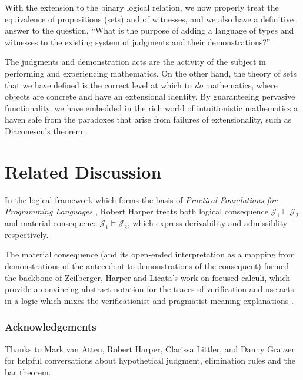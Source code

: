 \documentclass[11pt]{amsart}
\theoremstyle{definition}
\theoremstyle{remark}
\numberwithin{equation}{section}
\newcommand\JJ{\mathcal{J}}
\begin{document}
With the extension to the binary logical relation, we now properly treat the
equivalence of propositions (sets) and of witnesses, and we also have a
definitive answer to the question, ``What is the purpose of adding a language of
types and witnesses to the existing system of judgments and their
demonstrations?''

The judgments and demonstration acts are the activity of the subject in
performing and experiencing mathematics. On the other hand, the theory of sets
that we have defined is the correct level at which to \emph{do} mathematics,
where objects are concrete and have an extensional identity. By guaranteeing
pervasive functionality, we have embedded in the rich world of intuitionistic
mathematics a haven safe from the paradoxes that arise from failures of
extensionality, such as Diaconescu's theorem \cite{sterling:diaconescu}.

\section{Related Discussion}

In the logical framework which forms the basis of \emph{Practical Foundations
for Programming Languages} \cite{PFPL}, Robert Harper treats both logical
consequence $\JJ_1\vdash\JJ_2$ and material consequence $\JJ_1\vDash\JJ_2$,
which express derivability and admissiblity respectively.

The material consequence (and its open-ended interpretation as a mapping from
demonstrations of the antecedent to demonstrations of the consequent) formed the
backbone of Zeilberger, Harper and Licata's work on focused calculi, which
provide a convincing abstract notation for the traces of verification and use
acts in a logic which mixes the verificationist and pragmatist meaning
explanations \cite{zeilberger:thesis, licata-zeilberger-harper:focusing,
zeilberger:2008}.


\subsubsection*{Acknowledgements}

Thanks to Mark van Atten, Robert Harper, Clarissa Littler, and Danny Gratzer for
helpful conversations about hypothetical judgment, elimination rules and the bar
theorem.

\newpage

\nocite{*}


\end{document}
